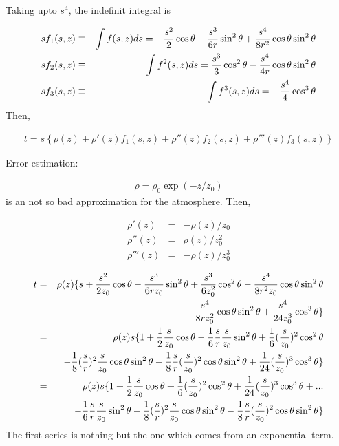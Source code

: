 Taking upto $s^4$, the indefinit integral is

\begin{eqnarray}
sf_1(s,z) & \equiv &\int{f(s,z)ds} =-{s^2 \over 2}\cos\theta + {s^3 \over 6r}\sin^2\theta + {s^4 \over 8r^2}\cos\theta\sin^2\theta\\
sf_2(s,z) &  \equiv &\int{f^2(s,z)ds} = {s^3 \over 3}\cos^2\theta-{s^4 \over 4r}\cos\theta\sin^2\theta\\
sf_3(s,z)& \equiv &\int{f^3(s,z)ds} =-{s^4 \over 4}\cos^3\theta
\end{eqnarray}
Then,


\begin{eqnarray}\label{gett}
t=s \left\{  \rho(z) + \rho'(z)f_1(s,z)+\rho''(z)f_2(s,z)+\rho'''(z)f_3(s,z) \right\}
\end{eqnarray}


Error estimation:



\begin{eqnarray}
\rho = \rho_0 \exp(-z/z_0)
\end{eqnarray}
is an not so bad approximation for the atmosphere.  Then,

\begin{eqnarray}
\rho'(z) &=&- \rho(z)/z_0\nonumber \\
\rho''(z) & = & \rho(z)/z_0^2\\
\rho'''(z) &=& -\rho(z)/z_0^3
\end{eqnarray}

\begin{eqnarray}
t&=&\rho(z)\{s + {s^2 \over 2z_0}\cos\theta-{s^3 \over 6rz_0}\sin^2\theta +{s^3 \over 6z_0^2}\cos^2\theta -{s^4 \over 8r^2z_0}\cos\theta\sin^2\theta\nonumber \\
& & - {s^4 \over 8rz_0^2}\cos\theta\sin^2\theta +{s^4 \over 24z_0^3}\cos^3\theta\} \\
%
&=&\rho(z)s\{ 1 + {1 \over 2}{s\over z_0}\cos\theta-{1 \over 6}{s\over r}{ s\over z_0}\sin^2\theta
 +{1 \over 6}({s\over z_0})^2\cos^2\theta \nonumber \\ 
%
& &-{1 \over 8}({s \over r})^2{s \over z_0}\cos\theta\sin^2\theta
-{ 1\over 8} {s \over r}({s \over z_0})^2\cos\theta\sin^2\theta
+{1 \over 24}({s \over z_0})^3\cos^3\theta\} \\
%
&=&\rho(z)s\{ 1 +{1 \over 2}{s\over z_0}\cos\theta+{1 \over 6}({s\over z_0})^2\cos^2\theta+{1 \over 24}({s \over z_0})^3\cos^3\theta + ...\\
& &
-{1 \over 6}{s\over r}{ s\over z_0}\sin^2\theta-{1 \over 8}({s \over r})^2{s \over z_0}\cos\theta\sin^2\theta
-{ 1\over 8} {s \over r}({s \over z_0})^2\cos\theta\sin^2\theta\}
\end{eqnarray}
The  first series is nothing but the one which comes from
an exponential term.

